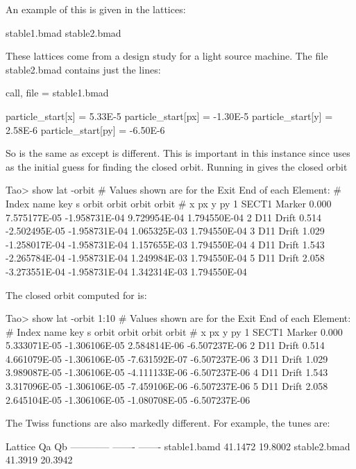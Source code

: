 \documentclass{hitec}     %
\begin{document}
An example of this is given in the lattices:
\begin{code}
  stable1.bmad
  stable2.bmad
\end{code}
These lattices come from a design study for a light source machine. The file stable2.bmad contains just
the lines:
\begin{code}
call, file = stable1.bmad

particle_start[x]  = 5.33E-5
particle_start[px] = -1.30E-5
particle_start[y]  = 2.58E-6
particle_start[py] = -6.50E-6
\end{code}
So  is the same as  except  is different. This
is important in this instance since \tao uses  as the initial guess for finding
the closed orbit. Running  in \tao gives the closed orbit
\begin{code}
Tao> show lat -orbit 
# Values shown are for the Exit End of each Element:
# Index  name    key          s         orbit         orbit         orbit         orbit
#                                              x            px             y            py
      1  SECT1   Marker      0.000  7.575177E-05 -1.958731E-04  9.729954E-04  1.794550E-04
      2  D11     Drift       0.514 -2.502495E-05 -1.958731E-04  1.065325E-03  1.794550E-04
      3  D11     Drift       1.029 -1.258017E-04 -1.958731E-04  1.157655E-03  1.794550E-04
      4  D11     Drift       1.543 -2.265784E-04 -1.958731E-04  1.249984E-03  1.794550E-04
      5  D11     Drift       2.058 -3.273551E-04 -1.958731E-04  1.342314E-03  1.794550E-04
\end{code}
The closed orbit computed for  is:
\begin{code}
Tao> show lat -orbit 1:10
# Values shown are for the Exit End of each Element:
# Index  name    key             s         orbit         orbit         orbit         orbit
#                                              x            px             y            py
      1  SECT1   Marker      0.000  5.333071E-05 -1.306106E-05  2.584814E-06 -6.507237E-06
      2  D11     Drift       0.514  4.661079E-05 -1.306106E-05 -7.631592E-07 -6.507237E-06
      3  D11     Drift       1.029  3.989087E-05 -1.306106E-05 -4.111133E-06 -6.507237E-06
      4  D11     Drift       1.543  3.317096E-05 -1.306106E-05 -7.459106E-06 -6.507237E-06
      5  D11     Drift       2.058  2.645104E-05 -1.306106E-05 -1.080708E-05 -6.507237E-06
\end{code}
The Twiss functions are also markedly different. For example, the tunes are:
\begin{code}
  Lattice            Qa        Qb     
  ------------    -------   -------
  stable1.bamd    41.1472   19.8002
  stable2.bmad    41.3919   20.3942  
\end{code}
\end{document}
